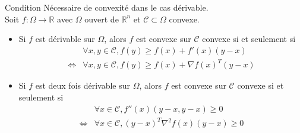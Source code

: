 \documentclass[12pt,a4paper]{article}
\newcommand{\propriete}[2]{%
    \begin{tcolorbox}[colback=white,colframe=green!25!white,title=\textbf{Propriété #1}, coltitle=black]
        #2
    \end{tcolorbox}
}
\begin{document}
\propriete{- CNS}{Condition Nécessaire de convexité dans le cas dérivable.\\
Soit $f : \Omega \rightarrow \mathbb{R}$ avec $\Omega$ ouvert de $\mathbb{R}^n$ et $\mathcal{C} \subset \Omega$ convexe.
\begin{itemize}
    \item Si $f$ est dérivable sur $\Omega$, alors $f$ est convexe sur $\mathcal{C}$ convexe si et seulement si
    \begin{align*}
        &\forall x, y \in \mathcal{C}, f(y) \geq f(x) + f'(x)(y - x)\\
        \Leftrightarrow &\forall x, y \in \mathcal{C}, f(y) \geq f(x) + \nabla f(x)^T(y - x)
    \end{align*}
    \item Si $f$ est deux fois dérivable sur $\Omega$, alors $f$ est convexe sur $\mathcal{C}$ convexe si et seulement si
    \begin{align*}
        &\forall x \in \mathcal{C}, f''(x)(y - x, y - x) \geq 0\\
        \Leftrightarrow &\forall x \in \mathcal{C}, (y - x)^T \nabla^2 f(x) (y - x) \geq 0
    \end{align*}
\end{itemize}
}
\end{document}
